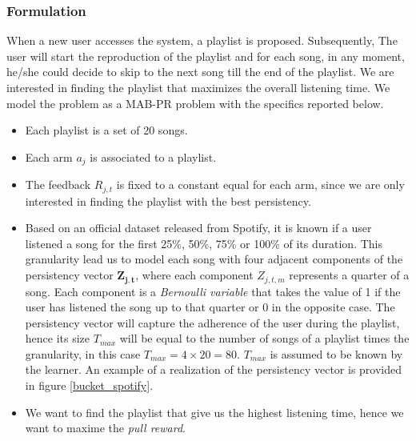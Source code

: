 \subsubsection*{Formulation}
When a new user accesses the system, a playlist is proposed. Subsequently, The user will start the reproduction of the playlist and for each song, in any moment, he/she could decide to skip to the next song till the end of the playlist. We are interested in finding the playlist that maximizes the overall listening time. We model the problem as a MAB-PR problem with the specifics reported below.
\begin{itemize}
	\item Each playlist is a set of 20 songs.
	\item Each arm $a_j$ is associated to a playlist.
	\item The feedback $R_{j,t}$ is fixed to a constant equal for each arm, since we are only interested in finding the playlist with the best persistency.
	\item Based on an official dataset released from Spotify, it is known if a user listened a song for the first 25\%, 50\%, 75\% or 100\% of its duration. This granularity lead us to model each song with four adjacent components of the persistency vector $\boldsymbol{Z_{j,t}}$, where each component $Z_{j,t,m}$ represents a quarter of a song. Each component is a \emph{Bernoulli variable} that takes the value of 1 if the user has listened the song up to that quarter or 0 in the opposite case. The persistency vector will capture the adherence of the user during the playlist, hence its size $T_{max}$ will be equal to  the number of songs of a playlist times the granularity, in this case $T_{max} = 4 \times 20 = 80$. $T_{max}$ is assumed to be known by the learner.  An example of a realization of the persistency vector is provided in figure \ref{bucket_spotify}.
	\item We want to find the playlist that give us the highest listening time, hence we want to maxime the \emph{pull reward}.
	
\end{itemize}

